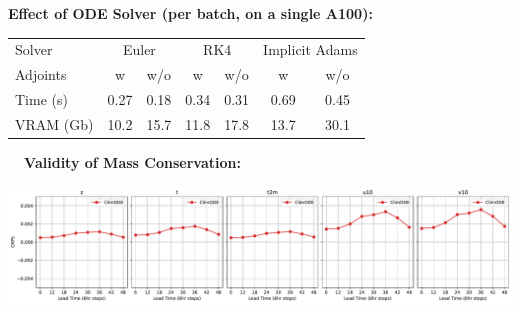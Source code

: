 \documentclass[landscape,a1paper,fontscale=0.424]{baposter}
\begin{document}
\begin{poster}
{        \begin{minipage}[t]{0.48\textwidth}
            \vspace{0.5em}
            \textbf{\color{blue}Effect of ODE Solver (per batch, on a single A100):}\\[0.2em]
            \begin{tabular}{lcccccc}
                \hline
                Solver & \multicolumn{2}{c}{Euler} & \multicolumn{2}{c}{RK4} & \multicolumn{2}{c}{Implicit Adams} \\
                Adjoints & w & w/o & w & w/o & w & w/o \\
                \hline
                Time (s) & {\cellcolor[HTML]{FEDDBC}} \color[HTML]{000000} 0.27 & {\cellcolor[HTML]{FFF5EB}} \color[HTML]{000000} 0.18 & {\cellcolor[HTML]{FDBF86}} \color[HTML]{000000} 0.34 & {\cellcolor[HTML]{FDCFA0}} \color[HTML]{000000} 0.31 & {\cellcolor[HTML]{7F2704}} \color[HTML]{F1F1F1} 0.69 & {\cellcolor[HTML]{FA8532}} \color[HTML]{F1F1F1} 0.45 \\
                VRAM (Gb) & {\cellcolor[HTML]{FFF5EB}} \color[HTML]{000000} 10.2 & {\cellcolor[HTML]{FDC997}} \color[HTML]{000000} 15.7 & {\cellcolor[HTML]{FEECD9}} \color[HTML]{000000} 11.8 & {\cellcolor[HTML]{FDAD69}} \color[HTML]{000000} 17.8 & {\cellcolor[HTML]{FEDDBC}} \color[HTML]{000000} 13.7 & {\cellcolor[HTML]{7F2704}} \color[HTML]{F1F1F1} 30.1 \\
                \hline
            \end{tabular}
        \end{minipage}\hfill
        \begin{minipage}[t]{0.5\textwidth}
            \vspace{0.5em}
            \textbf{\color{blue}~~Validity of Mass Conservation:}
            \vspace{-0.5em}
            \begin{center}
                \includegraphics[width=\textwidth]{mass_conservation.pdf}
            \end{center}
        \end{minipage}
    }
\end{poster}
\end{document}
